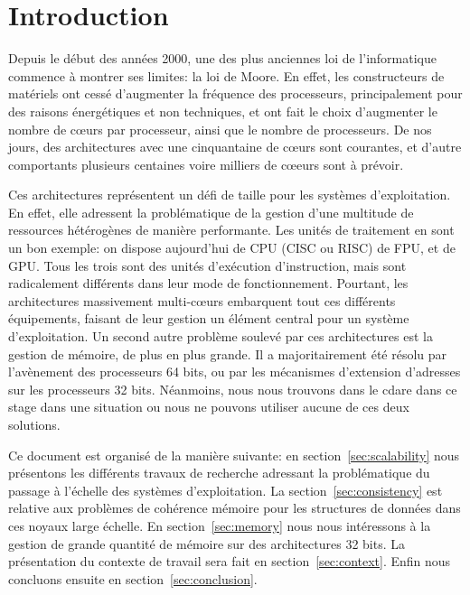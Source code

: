 \section{Introduction}

  \hspace{1cm}Depuis le début des années 2000, une des plus anciennes loi de
  l'informatique commence à montrer ses limites: la loi de Moore. En effet, les
  constructeurs de matériels ont cessé d'augmenter la fréquence des processeurs,
  principalement pour des raisons énergétiques et non techniques, et ont fait le
  choix d'augmenter le nombre de c\oe urs par processeur, ainsi que le nombre de
  processeurs. De nos jours, des architectures avec une cinquantaine de c\oe urs
  sont courantes, et d'autre comportants plusieurs centaines voire milliers de
  c\oe eurs sont à prévoir.\newline
  
  \hspace{1cm}Ces architectures représentent un défi de taille pour les systèmes
  d'exploitation. En effet, elle adressent la problématique de la gestion d'une
  multitude de ressources hétérogènes de manière performante. Les unités de
  traitement en sont un bon exemple: on dispose aujourd'hui de CPU (CISC ou
  RISC) de FPU, et de GPU. Tous les trois sont des unités d'exécution
  d'instruction, mais sont radicalement différents dans leur mode de
  fonctionnement. Pourtant, les architectures massivement multi-c\oe urs
  embarquent tout ces différents équipements, faisant de leur gestion un élément
  central pour un système d'exploitation.  Un second autre problème soulevé par
  ces architectures est la gestion de mémoire, de plus en plus grande. Il a
  majoritairement été résolu par l'avènement des processeurs 64 bits, ou par les
  mécanismes d'extension d'adresses sur les processeurs 32 bits. Néanmoins, nous
  nous trouvons dans le cdare dans ce stage dans une situation ou nous ne
  pouvons utiliser aucune de ces deux solutions.\newline
  
  \hspace{1cm}Ce document est organisé de la manière suivante: en
  section~\ref{sec:scalability} nous présentons les différents travaux de
  recherche adressant la problématique du passage à l'échelle des systèmes
  d'exploitation. La section~\ref{sec:consistency} est relative aux problèmes de
  cohérence mémoire pour les structures de données dans ces noyaux large
  échelle. En section~\ref{sec:memory} nous nous intéressons à la gestion de
  grande quantité de mémoire sur des architectures 32 bits. La présentation du
  contexte de travail sera fait en section~\ref{sec:context}. Enfin nous
  concluons ensuite en section~\ref{sec:conclusion}.
